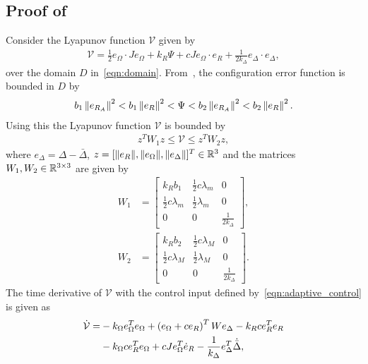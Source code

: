 \documentclass[10pt,fleqn]{IJCAS}  %
\begin{document}
\begin{multicols}{2}
\subsection{Proof of~}\label{proof:adaptive_control}
Consider the Lyapunov function \( \mathcal{V} \) given by
\begin{align*}
	\mathcal{V} = \frac{1}{2} e_\Omega \cdot J e_\Omega + k_R \Psi + c J e_\Omega \cdot e_R + \frac{1}{2 k_\Delta} e_\Delta \cdot e_\Delta , %
\end{align*}
over the domain \( D \) in~\cref{eqn:domain}.
From~, the configuration error function is bounded in \( D \) by
\begin{align*}
    b_1 \left\| e_{R_A} \right\|^2 < b_1 \left\| e_{R} \right\|^2 < \Psi < b_2 \left\| e_{R_A} \right\|^2 < b_2 \left\| e_{R} \right\|^2 .
\end{align*}
Using this the Lyapunov function \( \mathcal{V} \) is bounded by
\begin{align*} %
	z^T W_1 z \leq \mathcal{V} \leq z^T W_2 z ,
\end{align*}
where \( e_\Delta = \Delta - \bar{\Delta} \), \( z = [\|e_R\|,\|e_\Omega\|,\|e_\Delta\|]^T\in\mathbb{R}^3 \) and the matrices \(W_1,W_2 \in \mathbb{R}^{3 \times 3}\) are given by
\begin{align*}
	W_1 & = \begin{bmatrix}
		k_R b_1 & \frac{1}{2} c \lambda_m & 0 \\
		\frac{1}{2} c \lambda_m & \frac{1}{2} \lambda_m & 0 \\
		0 & 0 & \frac{1}{2 k_\Delta}
	\end{bmatrix},\\
	W_2 & = \begin{bmatrix}
		k_R b_2 & \frac{1}{2} c \lambda_M & 0 \\
		\frac{1}{2} c \lambda_M & \frac{1}{2} \lambda_M & 0 \\
		0 & 0 & \frac{1}{2 k_\Delta}
	\end{bmatrix} .
\end{align*}
The time derivative of \( \mathcal{V}\) with the control input defined by~\cref{eqn:adaptive_control} is given as
\begin{align}
	\dot{\mathcal{V}} =& - k_\Omega e_\Omega^T e_\Omega + \parenth{e_\Omega + c e_R}^T W e_\Delta - k_R c e_R^T e_R \nonumber\\
	&- k_\Omega c e_R^T e_\Omega + c J e_\Omega^T \dot{e}_R - \frac{1}{k_\Delta} e_\Delta^T \dot{\bar{\Delta}} , \label{eqn:vdot}

\end{align}
\end{multicols}
\end{document}
